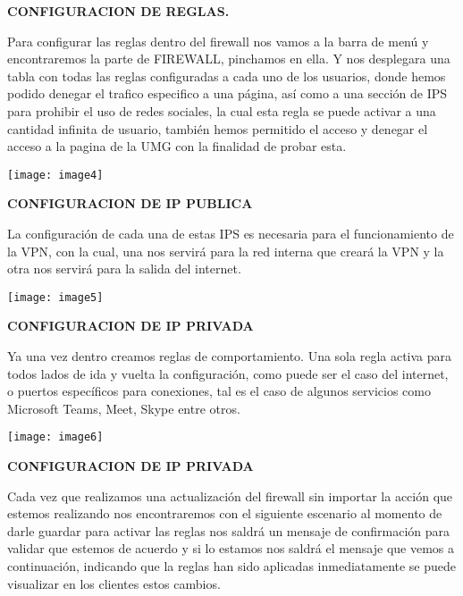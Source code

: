 \documentclass{article} %
\begin{document}
\noindent \textbf{CONFIGURACION DE REGLAS.}

\noindent Para configurar las reglas dentro del firewall nos vamos a la barra de men\'{u} y encontraremos la parte de FIREWALL, pinchamos en ella. Y nos desplegara una tabla con todas las reglas configuradas a cada uno de los usuarios, donde hemos podido denegar el trafico especifico a una p\'{a}gina, as\'{i} como a una secci\'{o}n de IPS para prohibir el uso de redes sociales, la cual esta regla se puede activar a una cantidad infinita de usuario, tambi\'{e}n hemos permitido el acceso y denegar el acceso a la pagina de la UMG con la finalidad de probar esta.

\noindent \texttt{[image: image4]}

\noindent 

\noindent \textbf{CONFIGURACION DE IP PUBLICA}

\noindent La configuraci\'{o}n de cada una de estas IPS es necesaria para el funcionamiento de la VPN, con la cual, una nos servir\'{a} para la red interna que crear\'{a} la VPN y la otra nos servir\'{a} para la salida del internet.

\noindent 

\noindent \texttt{[image: image5]}

\noindent \textbf{}

\noindent \textbf{}

\noindent \textbf{CONFIGURACION DE IP PRIVADA}

\noindent Ya una vez dentro creamos reglas de comportamiento. Una sola regla activa para todos lados de ida y vuelta la configuraci\'{o}n, como puede ser el caso del internet, o puertos espec\'{i}ficos para conexiones, tal es el caso de algunos servicios como Microsoft Teams, Meet, Skype entre otros.  

\noindent 

\noindent \texttt{[image: image6]}

\noindent 

\noindent \textbf{CONFIGURACION DE IP PRIVADA}

\noindent Cada vez que realizamos una actualizaci\'{o}n del firewall sin importar la acci\'{o}n que estemos realizando nos encontraremos con el siguiente escenario al momento de darle guardar para activar las reglas nos saldr\'{a} un mensaje de confirmaci\'{o}n para validar que estemos de acuerdo y si lo estamos nos saldr\'{a} el mensaje que vemos a continuaci\'{o}n, indicando que la reglas han sido aplicadas inmediatamente se puede visualizar en los clientes estos cambios.
\end{document}
